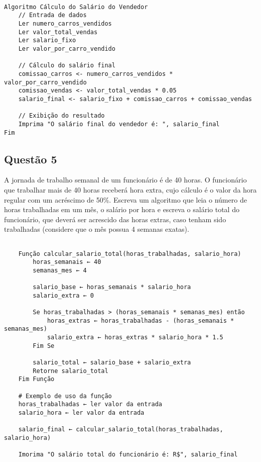 \documentclass[a4paper, 12pt, onecolumn,singlespacing]{article}
\begin{document}
\begin{verbatim}
	
Algoritmo Cálculo do Salário do Vendedor
	// Entrada de dados
	Ler numero_carros_vendidos
	Ler valor_total_vendas
	Ler salario_fixo
	Ler valor_por_carro_vendido
	
	// Cálculo do salário final
	comissao_carros <- numero_carros_vendidos * valor_por_carro_vendido
	comissao_vendas <- valor_total_vendas * 0.05
	salario_final <- salario_fixo + comissao_carros + comissao_vendas
	
	// Exibição do resultado
	Imprima "O salário final do vendedor é: ", salario_final
Fim
\end{verbatim}

\subsection{Questão 5}

A jornada de trabalho semanal de um funcionário é de 40 horas. O funcionário que trabalhar mais	de 40 horas receberá hora extra, cujo cálculo é o valor da hora regular com um acréscimo de 50\%.
Escreva um algoritmo que leia o número de horas trabalhadas em um mês, o salário por hora e escreva o salário total do funcionário, que deverá ser acrescido das horas extras, caso tenham sido trabalhadas (considere que o mês possua 4 semanas exatas).
\begin{verbatim}
	
	Função calcular_salario_total(horas_trabalhadas, salario_hora)
		horas_semanais ← 40
		semanas_mes ← 4
		
		salario_base ← horas_semanais * salario_hora
		salario_extra ← 0
		
		Se horas_trabalhadas > (horas_semanais * semanas_mes) então
			horas_extras ← horas_trabalhadas - (horas_semanais * semanas_mes)
			salario_extra ← horas_extras * salario_hora * 1.5
		Fim Se
		
		salario_total ← salario_base + salario_extra
		Retorne salario_total
	Fim Função
	
	# Exemplo de uso da função
	horas_trabalhadas ← ler valor da entrada
	salario_hora ← ler valor da entrada
	
	salario_final ← calcular_salario_total(horas_trabalhadas, salario_hora)
	
	Imorima "O salário total do funcionário é: R$", salario_final
\end{verbatim}
\end{document}

